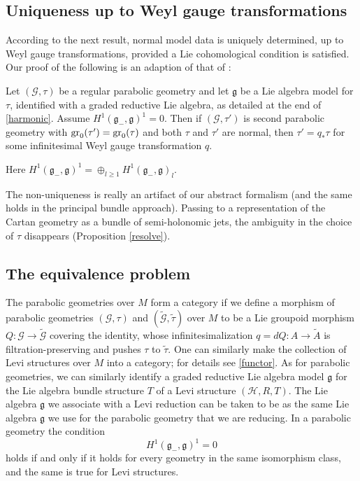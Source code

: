\documentclass[leqno,12pt]{amsart} %
\begin{document}
\subsection{Uniqueness up to Weyl gauge transformations}\label{uniqueness}
According to the next result, normal model data is uniquely determined, up to Weyl gauge
transformations, provided a Lie cohomological condition is satisfied. Our proof of the
following is an adaption of that of \cite[Proposition 3.1.14]{Cap_Slovak_09}:

\begin{theorem} Let $({\mathcal G}, \tau)$ be a regular parabolic
  geometry and let ${\mathfrak g} $ be a Lie algebra model for $\tau $, identified with a
  graded reductive Lie algebra, as detailed at the end of \ref{harmonic}. Assume
  $H^1({\mathfrak g}_-, {\mathfrak g})^1=0$.  Then if $({\mathcal G}, \tau')$ is second
  parabolic geometry with $\operatorname{\operatorname{gr}}_0(\tau')=\operatorname{\operatorname{gr}}_0(\tau)$ and both $\tau $ and $\tau'$
  are normal, then $\tau' = q_*\tau$ for some infinitesimal Weyl gauge transformation $q$.
\end{theorem}
\noindent%
Here
$H^1({\mathfrak g}_-, {\mathfrak g})^1=\oplus_{l \ge 1}H^1({\mathfrak g}_-, {\mathfrak
  g})_l$.

\begin{remark}
  The non-uniqueness is really an artifact of our abstract formalism (and the same holds
  in the principal bundle approach). Passing to a representation of the Cartan geometry as
  a bundle of semi-holonomic jets, the ambiguity in the choice of $\tau$ disappears
  (Proposition \ref{resolve}).
\end{remark}

\subsection{The equivalence problem}\label{equivalence}
The parabolic geometries over $M$ form a category if we define a morphism of parabolic
geometries $({\mathcal G}, \tau)$ and $(\tilde {\mathcal G} , \tilde \tau)$ over $M$ to be
a Lie groupoid morphism $Q \colon {\mathcal G} \rightarrow \tilde {\mathcal G} $ covering
the identity, whose infinitesimalization $q=dQ \colon A \rightarrow \tilde A$ is
filtration-preserving and pushes $\tau $ to $\tilde \tau$. One can similarly make the
collection of Levi structures over $M$ into a category; for details see \ref{functor}.  As
for parabolic geometries, we can similarly identify a graded reductive Lie algebra model
${\mathfrak g} $ for the Lie algebra bundle structure $T$ of a Levi structure
$({\mathcal H}, R, T)$. The Lie algebra ${\mathfrak g} $ we associate with a Levi
reduction can be taken to be as the same Lie algebra ${\mathfrak g} $ we use for the
parabolic geometry that we are reducing. In a parabolic geometry the condition
\begin{equation}
  \label{coarse}
H^1({\mathfrak g}_-, {\mathfrak g})^1=0
\end{equation}
holds if and only if it holds for every geometry in the same isomorphism class, and the
same is true for Levi structures.
\end{document}
